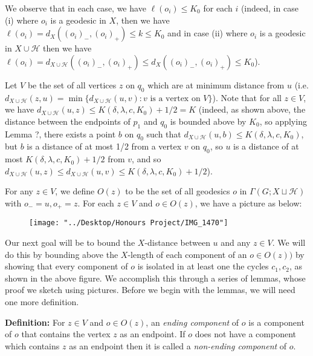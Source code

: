 \documentclass[12pt]{article}
\newcommand{\vs}{\vskip10pt}
\begin{document}
	We observe that in each case, we have $\ell(o_i) \leq K_0$ for each $i$ (indeed, in case (i) where $o_i$ is a geodesic in $X$, then we have $\ell(o_i) = d_X((o_i)_-, (o_i)_+) \leq k \leq K_0$ and in case (ii) where $o_i$ is a geodesic in $X \cup \mathcal{H}$ then we have $\ell(o_i) = d_{X \cup \mathcal{H}}((o_i)_-, (o_i)_+) \leq d_X((o_i)_-, (o_i)_+) \leq K_0$).
	
	\vs 
	
	Let $V$ be the set of all vertices $z$ on $q_0$ which are at minimum distance from $u$ (i.e. $d_{X \cup \mathcal{H}}(z, u) = \min \{d_{X \cup \mathcal{H}}(u, v) : v \text{ is a vertex on } V\}$). Note that for all $z \in V$, we have $d_{X \cup \mathcal{H}}(u, z) \leq K(\delta, \lambda, c, K_0) + 1/2 = K$ (indeed, as shown above, the distance between the endpoints of $p_1$ and $q_0$ is bounded above by $K_0$, so applying Lemma ?, there exists a point $b$ on $q_0$ such that $d_{X \cup \mathcal{H}} (u, b) \leq K(\delta, \lambda, c, K_0)$, but $b$ is a distance of at most 1/2 from a vertex $v$ on $q_0$, so $u$ is a distance of at most $K(\delta, \lambda, c, K_0) + 1/2$ from $v$, and so $d_{X \cup \mathcal{H}}(u,z) \leq d_{X \cup \mathcal{H}}(u,v) \leq K(\delta, \lambda, c, K_0) + 1/2$). 
	
	\vs 
	
	For any $z \in V$, we define $O(z)$ to be the set of all geodesics $o$ in $\Gamma(G; X \sqcup \mathcal{H})$ with $o_- = u, o_+ = z$. For each $z \in V$ and $o \in O(z)$, we have a picture as below: 
	
\begin{figure} [h]
	\centering
	\texttt{[image: "../Desktop/Honours Project/IMG\_1470"]}
	\caption{}
	\label{fig:img1470}
\end{figure}
	
	Our next goal will be to bound the $X$-distance between $u$ and any $z \in V$. We will do this by bounding above the $X$-length of each component of an $o \in O(z))$ by showing that every component of $o$ is isolated in at least one the cycles $c_1, c_2$, as shown in the above figure. We accomplish this through a series of lemmas, whose proof we sketch using pictures. Before we begin with the lemmas, we will need one more definition. 
	
	\vs 
	
	\textbf{Definition: } For $z \in V$ and $o \in O(z)$, an \textit{ending component} of $o$ is a component of $o$ that contains the vertex $z$ as an endpoint. If $o$ does not have a component which contains $z$ as an endpoint then it is called a \textit{non-ending component} of $o$.
	
\end{document}
